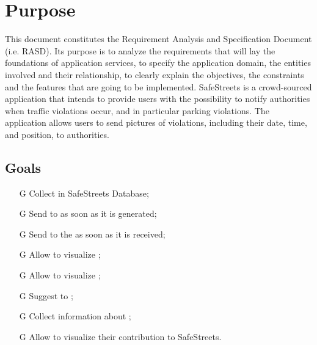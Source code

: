 \documentclass[../../rasd.tex]{subfiles}
\begin{document}
\section{Purpose\label{sect:1.1}}

This document constitutes the Requirement Analysis and Specification Document (i.e. RASD). Its purpose is to analyze the requirements that will lay the foundations of application services, to specify the application domain, the entities involved and their relationship, to clearly explain the objectives, the constraints and the features that are going to be implemented. \newline
SafeStreets is a crowd-sourced application that intends to provide users with the possibility to notify authorities when traffic violations occur, and in particular parking violations. The application allows users to send pictures of violations, including their date, time, and position, to authorities.
			
\subsection{Goals\label{sect:1.1.1}}

\begin{itemize}
		\item[G\subs{1}]Collect  in SafeStreets Database;
		\item[G\subs{2}]Send  to  as soon as it is generated;
		\item[G\subs{3}]Send  to the  as soon as it is received;
		\item[G\subs{4}]Allow  to visualize ;
		\item[G\subs{5}]Allow  to visualize ;
		\item[G\subs{6}]Suggest  to ;
		\item[G\subs{7}]Collect information about ;
		\item[G\subs{8}]Allow  to visualize their contribution to SafeStreets.
\end{itemize}
\end{document}
